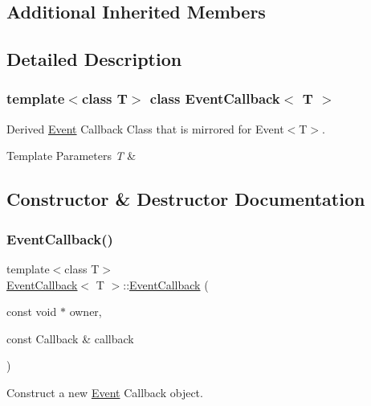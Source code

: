 \subsection*{Additional Inherited Members}


\subsection{Detailed Description}
\subsubsection*{template$<$class T$>$\newline
class Event\+Callback$<$ T $>$}

Derived \hyperlink{classEvent}{Event} Callback Class that is mirrored for Event$<$\+T$>$. 


\begin{DoxyTemplParams}{Template Parameters}
{\em T} & \\
\hline
\end{DoxyTemplParams}


\subsection{Constructor \& Destructor Documentation}
\mbox{\label{classEventCallback_ab3a3dabfd2f7a9e13905a2aa9dc3e237}} 
\subsubsection{\texorpdfstring{Event\+Callback()}{EventCallback()}\hspace{0.1cm}{\footnotesize\ttfamily [1/2]}}
{\footnotesize\ttfamily template$<$class T$>$ \\
\hyperlink{classEventCallback}{Event\+Callback}$<$ T $>$\+::\hyperlink{classEventCallback}{Event\+Callback} (\begin{DoxyParamCaption}\item[{const void $\ast$}]{owner,  }\item[{const Callback \&}]{callback }\end{DoxyParamCaption})\hspace{0.3cm}{\ttfamily [inline]}}



Construct a new \hyperlink{classEvent}{Event} Callback object. 


